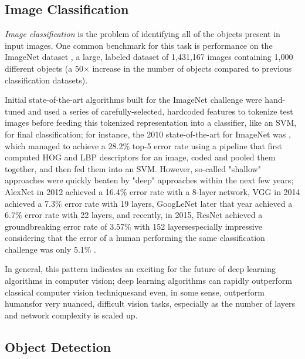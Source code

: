 \documentclass{article}
\begin{document}
\subsection{Image Classification}

\textit{Image classification} is the problem of identifying all of the objects present in input images. One common benchmark for this task is performance on the ImageNet dataset \cite{deng2009imagenet}, a large, labeled dataset of 1,431,167 images containing 1,000 different objects (a 50$\times$ increase in the number of objects compared to previous classification datasets).

Initial state-of-the-art algorithms built for the ImageNet challenge were hand-tuned and used a series of carefully-selected, hardcoded features to tokenize test images before feeding this tokenized representation into a classifier, like an SVM, for final classification; for instance, the 2010 state-of-the-art for ImageNet was \cite{lin2011large}, which managed to achieve a 28.2\% top-5 error rate using a pipeline that first computed HOG and LBP descriptors for an image, coded and pooled them together, and then fed them into an SVM. However, so-called "shallow" approaches were quickly beaten by "deep" approaches within the next few years; AlexNet \cite{krizhevsky2012imagenet} in 2012 achieved a 16.4\% error rate with a 8-layer network, VGG \cite{simonyan2014very} in 2014 achieved a 7.3\% error rate with 19 layers, GoogLeNet \cite{szegedy2015going} later that year achieved a 6.7\% error rate with 22 layers, and recently, in 2015, ResNet \cite{he2016deep} achieved a groundbreaking error rate of 3.57\% with 152 layers\textemdash especially impressive considering that the error of a human performing the same classification challenge was only 5.1\% \cite{russakovsky2015imagenet}.

In general, this pattern indicates an exciting for the future of deep learning algorithms in computer vision; deep learning algorithms can rapidly outperform classical computer vision techniques\textemdash and even, in some sense, outperform humans\textemdash for very nuanced, difficult vision tasks, especially as the number of layers and network complexity is scaled up.

\subsection{Object Detection}
\end{document}

